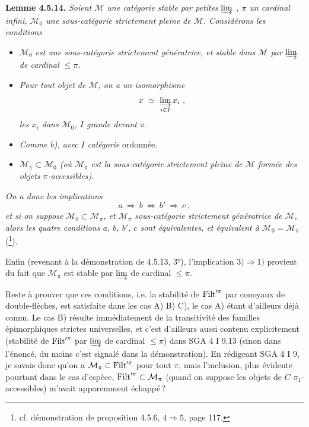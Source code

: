 \textbf{Lemme 4.5.14.} \textit{Soient $\mathcal{M}$ une catégorie stable par petites} $\varinjlim$ \textit{, $\pi$ un cardinal infini, $\mathcal{M}_0$ une sous-catégorie strictement pleine de $\mathcal{M}$. Considérons les conditions}
\begin{itemize}
\item[\textit{a)}] \textit{$\mathcal{M}_0$ est une sous-catégorie strictement génératrice, et stable dans $\mathcal{M}$ par} $\varinjlim$ \textit{de cardinal $\leqslant \pi$.}
\item[\textit{b)}] \textit{Pour tout objet de $\mathcal{M}$, on a un isomorphisme}
\[ x \ \simeq \ \varinjlim_{i\in I} x_i \ , \]
\textit{les $x_i$ dans $\mathcal{M}_0$, $I$ grande devant $\pi$.}

\item[\textit{b$'$)}] \textit{Comme b), avec $I$ catégorie} ordonnée.
\item[\textit{c)}] \textit{$\mathcal{M}_{\pi} \subset \mathcal{M}_0$ (où $\mathcal{M}_{\pi}$ est la sous-catégorie strictement pleine de $\mathcal{M}$ formée des objets $\pi$-accessibles).}
\end{itemize}
\textit{On a donc les implications}
\[ a \ \Longrightarrow \ b \ \Longleftrightarrow \ b' \ \Longrightarrow \ c \ , \]
\textit{et si on suppose $\mathcal{M}_0 \subset \mathcal{M}_{\pi}$, et $\mathcal{M}_{\pi}$ sous-catégorie strictement génératrice de $\mathcal{M}$, alors les quatre conditions $a$, $b$, $b'$, $c$ sont équivalentes, et équivalent à $\mathcal{M}_0 = \mathcal{M}_{\pi}$} (\footnote{cf. démonstration de proposition 4.5.6, $4 \Longrightarrow 5$, page 117.}).

Enfin (revenant à la démonstration de 4.5.13, 3°), l'implication $3) \Longrightarrow 1)$ provient du fait que $\mathcal{M}_{\pi}$ est stable par $\varinjlim$ de cardinal $\leqslant \pi$.

Reste à prouver que ces conditions, i.e. la stabilité de $\operatorname{Filt}'^{\pi}$ par conoyaux de double-flèches, est satisfaite dans les cas A) B) C), le cas A) étant d'ailleurs déjà connu. Le cas B) résulte immédiatement de la transitivité des familles épimorphiques strictes universelles, et c'est d'ailleurs aussi contenu explicitement (stabilité de $\operatorname{Filt}'^{\pi}$ par $\varinjlim$ de cardinal $\leqslant \pi$) dans SGA 4 I 9.13 (sinon dans l'énoncé, du moins c'est signalé dans la démonstration). En rédigeant SGA 4 I 9, je savais donc qu'on a $\mathcal{M}_{\pi} \subset \operatorname{Filt}'^{\pi}$ pour tout $\pi$, mais l'inclusion, plus évidente pourtant dans le cas d'espèce, $\operatorname{Filt}'^{\pi} \subset \mathcal{M}_{\pi}$ (quand on suppose les objets de $C$ $\pi_1$-accessibles) m'avait apparemment échappé\,?

